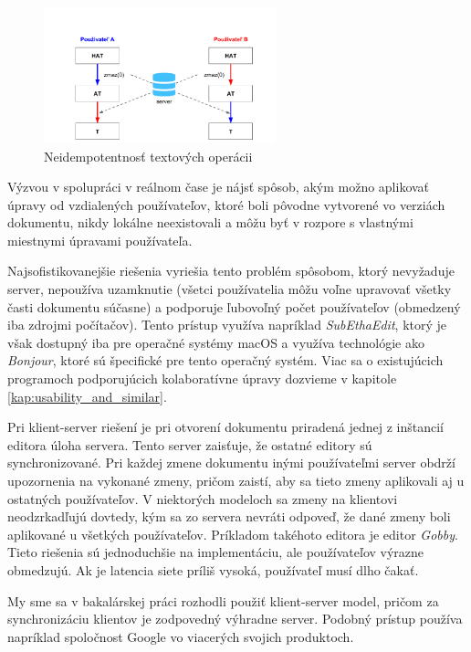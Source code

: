 \begin{figure}[H]
\centerline{\includegraphics[width=0.6\textwidth]{images/neidempotentne_operacie}}
\caption[Neidempotentnosť textových operácii]{Neidempotentnosť textových operácii}
\label{obr:neidempotentnost}
\end{figure}

Výzvou v spolupráci v reálnom čase je nájsť spôsob, akým možno aplikovať úpravy od vzdialených
používateľov, ktoré boli pôvodne vytvorené vo verziách dokumentu, nikdy lokálne neexistovali a môžu
byť v rozpore s vlastnými miestnymi úpravami používateľa. 

Najsofistikovanejšie riešenia vyriešia tento problém spôsobom, ktorý nevyžaduje server, nepoužíva
uzamknutie (všetci používatelia môžu voľne upravovať všetky časti dokumentu súčasne) a podporuje
ľubovoľný počet používateľov (obmedzený iba zdrojmi počítačov). Tento prístup využíva napríklad
\textit{SubEthaEdit}, ktorý je však dostupný iba pre operačné systémy macOS a využíva
technológie ako \textit{Bonjour}, ktoré sú špecifické pre tento operačný systém. Viac sa o
existujúcich programoch podporujúcich kolaboratívne úpravy dozvieme v kapitole
\ref{kap:usability_and_similar}.

Pri klient-server riešení je pri otvorení dokumentu priradená jednej z inštancií editora
úloha servera. Tento server zaisťuje, že ostatné editory sú synchronizované. Pri každej zmene
dokumentu inými používateľmi server obdrží upozornenia na vykonané zmeny, pričom zaistí, aby
sa tieto zmeny aplikovali aj u ostatných používateľov. 
V niektorých modeloch sa zmeny na klientovi neodzrkadľujú dovtedy,
kým sa zo servera nevráti odpoveď, že dané zmeny boli aplikované u všetkých používateľov.
Príkladom takéhoto editora je editor \textit{Gobby}. Tieto riešenia sú 
jednoduchšie na implementáciu, ale používateľov výrazne obmedzujú. Ak je latencia siete
príliš vysoká, používateľ musí dlho čakať.

My sme sa v bakalárskej práci rozhodli použiť klient-server model, pričom za synchronizáciu klientov
je zodpovedný výhradne server. Podobný prístup používa napríklad spoločnost Google vo 
viacerých svojich produktoch.

